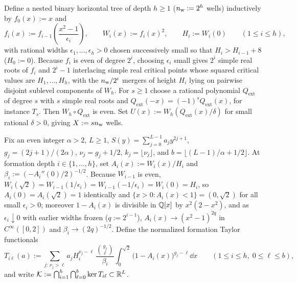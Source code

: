 Define a nested binary horizontal tree of depth $h\ge 1$ ($n_{\rm w}:=2^h$ wells) inductively by $f_0(x):=x$ and
\begin{equation}\label{eq:binary-tree}
  f_i(x) := f_{i-1}\left(\frac{x^2-1}{\epsilon_i}\right), \qquad W_i(x) := f_i(x)^2, \qquad H_i := W_i(0) \qquad (1\le i\le h),
\end{equation}
with rational widths $\epsilon_1,\dots,\epsilon_h>0$ chosen successively small so that $H_i>H_{i-1}+8$ ($H_0:=0$). Because $f_i$ is even of degree $2^i$, choosing $\epsilon_i$ small gives $2^i$ simple real roots of $f_i$ and $2^i-1$ interlacing simple real critical points whose squared critical values are $H_1,\dots,H_h$, with the $n_{\rm w}/2^i$ mergers of height $H_i$ lying on pairwise disjoint sublevel components of $W_h$. For $s\ge1$ choose a rational polynomial $Q_{\mathrm{ext}}$ of degree $s$ with $s$ simple real roots and $Q_{\mathrm{ext}}(-x)=(-1)^sQ_{\mathrm{ext}}(x)$, for instance $T_s$. Then $W_h\circ Q_{\mathrm{ext}}$ is even. Set $U(x):=W_h(Q_{\mathrm{ext}}(x)/\delta)$ for small rational $\delta>0$, giving $X:=s n_{\rm w}$ wells.

Fix an even integer $\alpha>2$, $L\ge 1$, $S(y)=\sum_{j=0}^{L-1}a_j y^{2j+1}$, $g_j=(2j+1)/(2\alpha)$, $\nu_j=g_j+1/2$, $k_j=\lfloor\nu_j\rfloor$, and $b=\lfloor(L-1)/\alpha+1/2\rfloor$. At formation depth $i\in\{1,\dots,h\}$, set $A_i(x):=W_i(x)/H_i$ and $\beta_i:=(-A_i''(0)/2)^{-1/2}$. Because $W_{i-1}$ is even, $W_i(\sqrt{2})=W_{i-1}(1/\epsilon_i)=W_{i-1}(-1/\epsilon_i)=W_i(0)=H_i$, so $A_i(0)=A_i(\sqrt{2})=1$ identically and $\{x>0:A_i(x)<1\}=(0,\sqrt{2})$ for all small $\epsilon_i>0$; moreover $1-A_i(x)$ is divisible in $\mathbb{Q}[x]$ by $x^2(2-x^2)$, and as $\epsilon_i\downarrow 0$ with earlier widths frozen ($q:=2^{i-1}$), $A_i(x)\to(x^2-1)^{2q}$ in $C^\infty([0,2])$ and $\beta_i\to(2q)^{-1/2}$. Define the normalized formation Taylor functionals
\begin{equation}\label{eq:historical-T}
  T_{i\ell}(a) := \sum_{j:\,\nu_j>\ell} a_j H_i^{\nu_j-\ell}\,\frac{\binom{g_j}{\ell}}{\beta_i}
  \int_0^{\sqrt{2}} \bigl(1-A_i(x)\bigr)^{g_j-\ell}\dd x \qquad (1\le i\le h,\; 0\le\ell\le b),
\end{equation}
and write $\mathcal{K}:=\bigcap_{i=1}^h\bigcap_{\ell=0}^b \ker T_{i\ell}\subset\mathbb{R}^L$.

